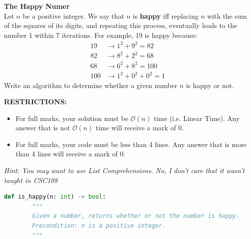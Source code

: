 \documentclass[letterpaper,13pt,addpoints]{exam}
\begin{document}
\begin{questions}
    \clearpage
    \question[10] \textbf{The Happy Numer} \\
    Let $n$ be a positive integer. We say that $n$ is \textbf{happy} iff replacing $n$ with the sum of the squares of its digits, and repeating this process, eventually leads to the number 1 within 7 iterations. For example, 19 is happy because:
    \begin{align*}
        19  & \rightarrow 1^2 + 9^2 = 82      \\
        82  & \rightarrow 8^2 + 2^2 = 68      \\
        68  & \rightarrow 6^2 + 8^2 = 100     \\
        100 & \rightarrow 1^2 + 0^2 + 0^2 = 1
    \end{align*}
    Write an algorithm to determine whether a given number $n$ is happy or not.

    \begin{center}
        \textbf{RESTRICTIONS:}
        \begin{itemize}
            \item For full marks, your solution must be $\mathcal{O}(n)$ time (i.e. Linear Time). Any answer that is not $\mathcal{O}(n)$ time will receive a mark of 0.
            \item For full marks, your code must be less than 4 lines. Any answer that is more
                  than 4 lines will receive a mark of 0.
        \end{itemize}
        \textit{Hint: You may want to use List Comprehensions.}
        \textit{No, I don't care that it wasn't taught in CSC108}
    \end{center}
    \begin{lstlisting}[language=Python, style=mystyle]
    def is_happy(n: int) -> bool:
        """
        Given a number, returns whether or not the number is happy.
        Precondition: n is a positive integer.
        """
    \end{lstlisting}


\end{questions}
\end{document}
